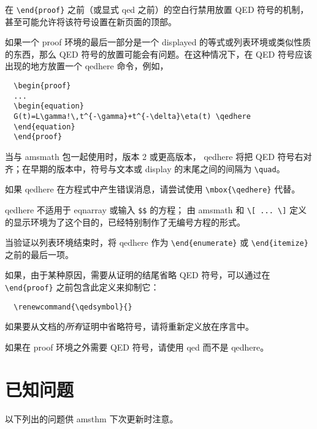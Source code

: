 \documentclass{article}
\newcommand{\ntt}{%
  \fontfamily\ttdefault \fontseries\mddefault \fontshape\updefault
  \selectfont
}
\DeclareRobustCommand{\cn}[1]{{\ntt\bslchar#1}}
\DeclareRobustCommand{\pkg}[1]{\textsf{#1}}
\DeclareRobustCommand{\env}[1]{{\ntt#1}}
\providecommand{\qedsymbol}{\leavevmode
  \hbox to.77778em{%
  \hfil\vrule
  \vbox to.675em{\hrule width.6em\vfil\hrule}%
  \vrule\hfil}}
\begin{document}
在 \verb+\end{proof}+ 之前（或显式 \cn{qed} 之前）的空白行禁用放置 QED 符号的机制，甚至可能允许将该符号设置在新页面的顶部。

如果一个 \env{proof} 环境的最后一部分是一个 displayed 的等式或列表环境或类似性质的东西，那么 QED 符号的放置可能会有问题。在这种情况下，在 QED 符号应该出现的地方放置一个 \cn{qedhere} 命令，例如，
\begin{verbatim}
  \begin{proof}
  ...
  \begin{equation}
  G(t)=L\gamma!\,t^{-\gamma}+t^{-\delta}\eta(t) \qedhere
  \end{equation}
  \end{proof}
\end{verbatim}
当与 \pkg{amsmath} 包一起使用时，版本 2 或更高版本，\cn{qedhere} 将把 QED 符号右对齐；在早期的版本中，符号与文本或 display 的末尾之间的间隔为 \verb+\quad+。

如果 \cn{qedhere} 在方程式中产生错误消息，请尝试使用 \verb+\mbox{\qedhere}+ 代替。

\cn{qedhere} 不适用于 \env{eqnarray} 或输入 \verb+$$+ 的方程；
由 \pkg{amsmath} 和 \verb+\[ ... \]+ 定义的显示环境为了这个目的，已经特别制作了无编号方程的形式。

当验证以列表环境结束时，将 \cn{qedhere} 作为 \verb+\end{enumerate}+ 或 \verb+\end{itemize}+ 之前的最后一项。

如果，由于某种原因，需要从证明的结尾省略 QED 符号，可以通过在 \verb+\end{proof}+ 之前包含此定义来抑制它：
\begin{verbatim}
  \renewcommand{\qedsymbol}{}
\end{verbatim}
如果要从文档的\emph{所有}证明中省略符号，请将重新定义放在序言中。

如果在 \env{proof} 环境之外需要 QED 符号，请使用 \cn{qed} 而不是 \cn{qedhere}。



\section{已知问题}

以下列出的问题供 \pkg{amsthm} 下次更新时注意。
\end{document}
